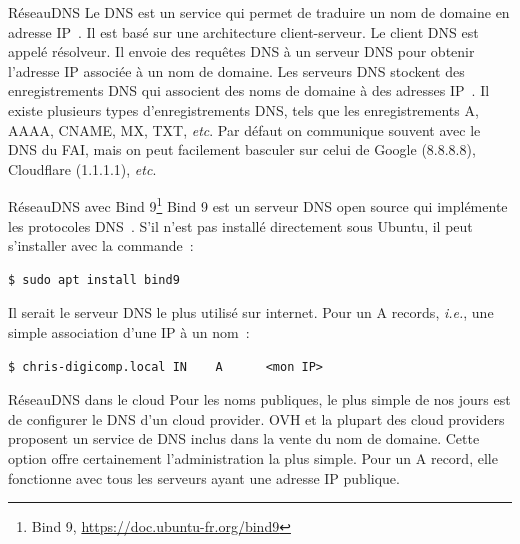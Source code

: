 \documentclass{beamer}
\begin{document}
    \begin{frame}{Réseau}{DNS}
        Le DNS est un service qui permet de traduire un nom de domaine en adresse IP~.
        Il est basé sur une architecture client-serveur.
        \bigbreak
        Le client DNS est appelé résolveur.
        Il envoie des requêtes DNS à un serveur DNS pour obtenir l'adresse IP associée à un nom de domaine.
        \bigbreak
        Les serveurs DNS stockent des enregistrements DNS qui associent des noms de domaine à des adresses IP~.
        Il existe plusieurs types d'enregistrements DNS, tels que les enregistrements A, AAAA, CNAME, MX, TXT, \textit{etc}.
        \bigbreak
        Par défaut on communique souvent avec le DNS du FAI, mais on peut facilement basculer sur celui de Google (8.8.8.8), Cloudflare (1.1.1.1), \textit{etc}.
    \end{frame}

    \begin{frame}[fragile]{Réseau}{DNS avec Bind 9\footnote{Bind 9, \url{https://doc.ubuntu-fr.org/bind9}}}
        Bind 9 est un serveur DNS open source qui implémente les protocoles DNS~.
        S'il n'est pas installé directement sous Ubuntu, il peut s'installer avec la commande~:
        \begin{lstlisting}
$ sudo apt install bind9
        \end{lstlisting}
        Il serait le serveur DNS le plus utilisé sur internet.
        \bigbreak
        Pour un A records, \textit{i.e.}, une simple association d'une IP à un nom~:
        \begin{lstlisting}
$ chris-digicomp.local IN    A      <mon IP>
        \end{lstlisting}
    \end{frame}

    \begin{frame}{Réseau}{DNS dans le cloud}
        Pour les noms publiques, le plus simple de nos jours est de configurer le DNS d'un cloud provider.
        \bigbreak
        OVH et la plupart des cloud providers proposent un service de DNS inclus dans la vente du nom de domaine.
        \bigbreak
        Cette option offre certainement l'administration la plus simple.
        Pour un A record, elle fonctionne avec tous les serveurs ayant une adresse IP publique.
    \end{frame}
\end{document}

